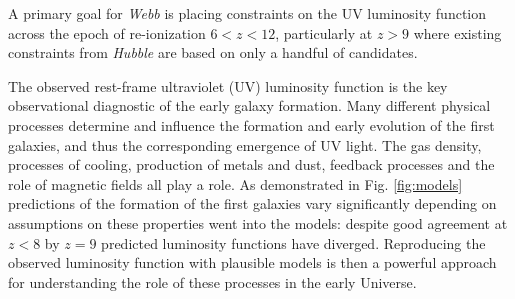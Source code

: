 \documentclass[12pt]{article}
\begin{document}


A primary goal for \emph{Webb} is placing constraints on the UV luminosity function across the epoch of re-ionization $6<z<12$, particularly at $z>9$ where existing constraints from \emph{Hubble} are based on only a handful of candidates.

The observed rest-frame ultraviolet (UV) luminosity function is the key observational diagnostic of the early galaxy formation. Many different physical processes determine and influence the formation and early evolution of the first galaxies, and thus the corresponding emergence of UV light. The gas density, processes of cooling, production of metals and dust, feedback processes and the role of magnetic fields all play a role. As demonstrated in Fig. \ref{fig:models} predictions of the formation of the first galaxies vary significantly depending on assumptions on these properties went into the models: despite good agreement at $z<8$ by $z=9$  predicted luminosity functions have diverged. Reproducing the observed luminosity function with plausible models is then a powerful approach for understanding the role of these processes in the early Universe.
\end{document}
